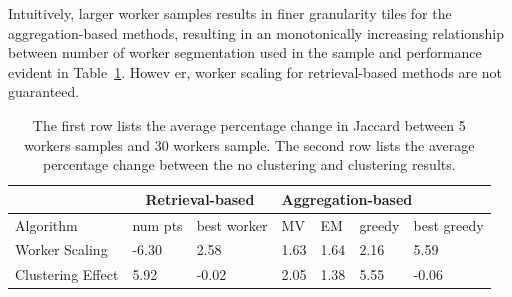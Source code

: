 Intuitively, larger worker samples results in finer granularity tiles for the aggregation-based methods, resulting in an monotonically increasing relationship between number of worker segmentation used in the sample and performance evident in Table~\ref{statsTable}. Howev er, worker scaling for retrieval-based methods are not guaranteed.
   \begin{table}
   \small
     \setlength\tabcolsep{1.5pt}
      \begin{tabular}{l|l|l|l|l|l|l}
         & \multicolumn{2}{c|}{Retrieval-based} & \multicolumn{4}{l}{Aggregation-based} \\ \hline
      Algorithm         & num pts         & best worker        & MV    & EM    & greedy  & best greedy  \\ \hline
      Worker Scaling    & -6.30           & 2.58               & 1.63  & 1.64  & 2.16    & 5.59         \\ \hline
      Clustering Effect & 5.92            & -0.02              & 2.05  & 1.38  & 5.55    & -0.06       
      \end{tabular}
      \caption{The first row lists the average percentage change in Jaccard between 5 workers samples and 30 workers sample. The second row lists the average percentage change between the no clustering and clustering results.}
      \label{statsTable}
      \vspace{-15pt}
   \end{table}